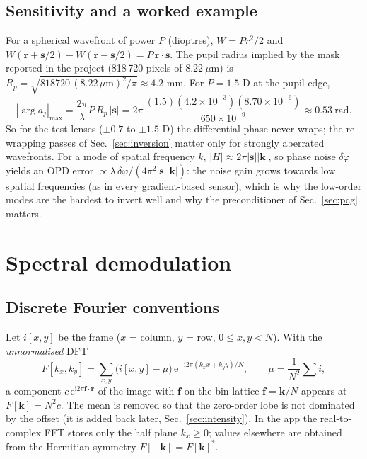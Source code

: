 \documentclass[11pt,a4paper]{article}
\theoremstyle{definition}
\newcommand{\vr}{\bm{r}}
\newcommand{\vk}{\bm{k}}
\newcommand{\vs}{\bm{s}}
\newcommand{\vf}{\bm{f}}
\newcommand{\ii}{\mathrm{i}}
\newcommand{\ee}{\mathrm{e}}
\begin{document}
\subsection{Sensitivity and a worked example}
For a spherical wavefront of power $P$ (dioptres), $W=Pr^2/2$ and $W(\vr+\vs/2)-W(\vr-\vs/2)=P\,\vr\cdot\vs$. The pupil radius implied by the mask
reported in the project (818\,720 pixels of $8.22\ \mu$m) is $R_p=\sqrt{818720\,(8.22\,\mu\mathrm m)^2/\pi}\approx4.2$ mm. For $P=1.5$ D at the pupil edge,
\[
|\arg a_j|_{\max}=\frac{2\pi}{\lambda}P\,R_p\,|\vs|=2\pi\,\frac{(1.5)(4.2\times10^{-3})(8.70\times10^{-6})}{650\times10^{-9}}\approx0.53\ \mathrm{rad}.
\]
So for the test lenses ($\pm0.7$ to $\pm1.5$ D) the differential phase never wraps; the re-wrapping passes of Sec.~\ref{sec:inversion} matter only for strongly aberrated wavefronts.
For a mode of spatial frequency $k$, $|H|\approx2\pi|\vs||\vk|$, so phase noise $\delta\varphi$ yields an OPD error $\propto\lambda\,\delta\varphi/(4\pi^2|\vs||\vk|)$: the noise gain
grows towards low spatial frequencies (as in every gradient-based sensor), which is why the low-order modes are the hardest to invert well and why the preconditioner of Sec.~\ref{sec:pcg} matters.

\section{Spectral demodulation}
\label{sec:demod}
\subsection{Discrete Fourier conventions}
Let $i[x,y]$ be the frame ($x$ = column, $y$ = row, $0\le x,y<N$). With the \emph{unnormalised} DFT
\begin{equation}
F[k_x,k_y]=\sum_{x,y}\big(i[x,y]-\mu\big)\,\ee^{-\ii2\pi(k_xx+k_yy)/N},\qquad \mu=\frac1{N^2}\sum i,
\label{eq:dft}
\end{equation}
a component $c\,\ee^{\ii2\pi\vf\cdot\vr}$ of the image with $\vf$ on the bin lattice $\vf=\bm k/N$ appears at $F[\bm k]=N^2c$. The mean is removed so that the
zero-order lobe is not dominated by the offset (it is added back later, Sec.~\ref{sec:intensity}). In the app the real-to-complex FFT stores only the half plane $k_x\ge0$; values elsewhere are
obtained from the Hermitian symmetry $F[-\bm k]=F[\bm k]^*$.
\end{document}
